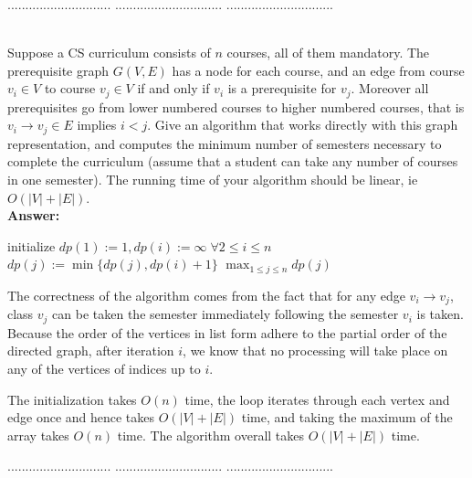 \documentclass{article}
\begin{document}
\pagebreak
{} $.............................$
 $..............................$
          $..............................$\\

\bigskip

\\
Suppose a CS curriculum consists of $n$ courses, all of them mandatory. The prerequisite graph $G(V,E)$
has a node for each course, and an edge from course $v_i\in V$ to course $v_j\in V$ if and only if $v_i$ is a prerequisite
for $v_j$. Moreover all prerequisites go from lower numbered courses to higher numbered courses, that is 
$v_i\rightarrow v_j \in E$ implies $i < j$.
Give an algorithm that works directly with this graph representation, and computes the
minimum number of semesters necessary to complete the curriculum (assume that a student
can take any number of courses in one semester). The running time of your algorithm should be
linear, ie $O(|V|+|E|)$. \\

\noindent
{\bf Answer:}
\begin{algorithm}[H] {\begin{algorithmic}[1]
    \State initialize $dp(1) := 1, dp(i) := \infty \; \forall 2 \leq i \leq n$
            \State $dp(j) := \min\{ dp(j), dp(i) + 1 \}$
        \EndFor
    \EndFor
    \State \Return $\max_{1 \leq j \leq n} dp(j)$
\end{algorithmic}} \end{algorithm}
The correctness of the algorithm comes from the fact that for any edge $v_i \to v_j$, class $v_j$ can be taken the semester immediately following the semester $v_i$ is taken. Because the order of the vertices in list form adhere to the partial order of the directed graph, after iteration $i$, we know that no processing will take place on any of the vertices of indices up to $i$. \par
The initialization takes $O(n)$ time, the loop iterates through each vertex and edge once and hence takes $O(|V| + |E|)$ time, and taking the maximum of the array takes $O(n)$ time. The algorithm overall takes $O(|V| + |E|)$ time.

\pagebreak
{} $.............................$
 $..............................$
          $..............................$\\
\end{document}
